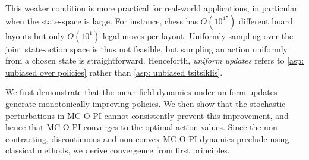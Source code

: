 This weaker condition is more practical for real-world applications, in particular when the state-space is large.
For instance, chess has $O(10^{45})$ different board layouts but only $O (10^1)$ legal moves per layout.
Uniformly sampling over the joint state-action space is thus not feasible, but sampling an action uniformly from a chosen state is straightforward.
Henceforth, \textit{uniform updates} refers to \autoref{asp: unbiased over policies} rather than \autoref{asp: unbiased tsitsiklis}.


We first demonstrate that the mean-field dynamics under uniform updates generate monotonically improving policies.
We then show that the stochastic perturbations in MC-O-PI cannot consistently prevent this improvement, and hence that MC-O-PI converges to the optimal action values.
Since the non-contracting, discontinuous and non-convex MC-O-PI dynamics preclude using classical methods, we derive convergence from first principles.






